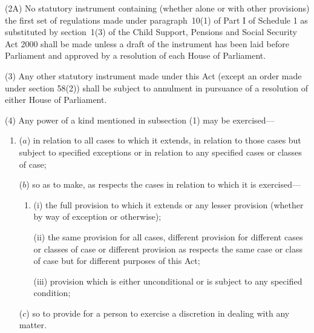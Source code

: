 \documentclass[12pt,a4paper]{article}
\begin{document}
(2A) No statutory instrument containing (whether alone or with other provisions) the first set of regulations made under paragraph~10(1)  of Part I of Schedule 1 as substituted by section~1(3)  of the Child Support, Pensions and Social Security Act 2000 shall be made unless a draft of the instrument has been laid before Parliament and approved by a resolution of each House of Parliament.

(3) Any other statutory instrument made under this Act (except an order made under section 58(2)) shall be subject to annulment in pursuance of a resolution of either House of Parliament.

(4) Any power of a kind mentioned in subsection (1)  may be exercised—
\begin{enumerate}\item[]
($a$) in relation to all cases to which it extends, in relation to those cases but subject to specified exceptions or in relation to any specified cases or classes of case;

($b$) so as to make, as respects the cases in relation to which it is exercised—
\begin{enumerate}\item[]
(i) the full provision to which it extends or any lesser provision (whether by way of exception or otherwise);

(ii) the same provision for all cases, different provision for different cases or classes of case or different provision as respects the same case or class of case but for different purposes of this Act;

(iii) provision which is either unconditional or is subject to any specified condition;
\end{enumerate}

($c$) so to provide for a person to exercise a discretion in dealing with any matter.
\end{enumerate}

\end{document}
